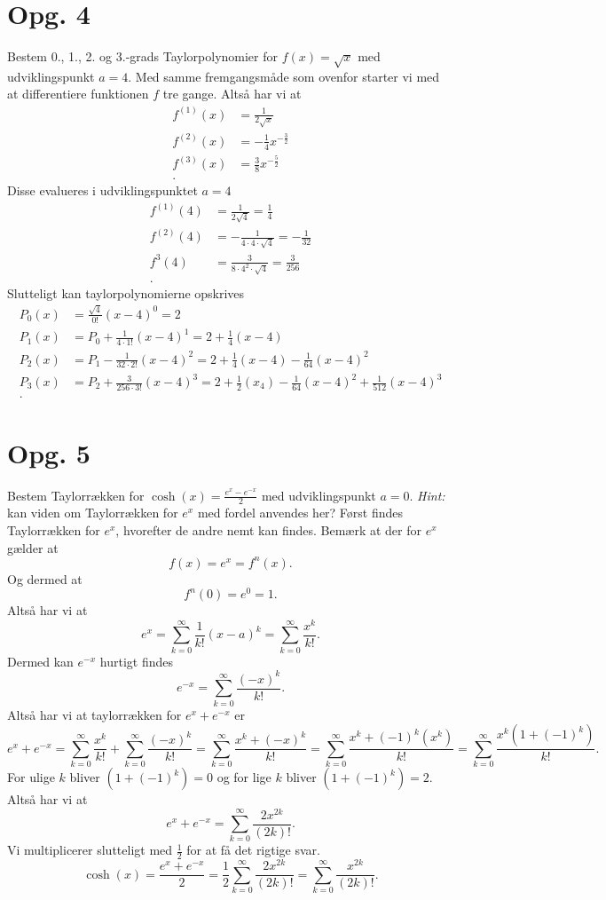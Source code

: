 \documentclass[12pt]{article}
\begin{document}
\section*{Opg. 4}
Bestem 0., 1., 2. og 3.-grads Taylorpolynomier for $f(x) = \sqrt{x}$ med udviklingspunkt $a=4$.
\bigbreak
Med samme fremgangsmåde som ovenfor starter vi med at differentiere funktionen $f$ tre gange. Altså har vi at
\begin{align*}
  f^{(1)}(x) &= \frac{1}{2\sqrt{x}} \\
  f^{(2)}(x) &= -\frac{1}{4}x^{-\frac{3}{2}} \\
  f^{(3)}(x) &= \frac{3}{8}x^{-\frac{5}{2}} \\
.\end{align*}
Disse evalueres i udviklingspunktet $a=4$
 \begin{align*}
  f^{(1)}(4) &= \frac{1}{2\sqrt{4}} = \frac{1}{4} \\
f^{(2)}(4) &= -\frac{1}{4\cdot 4\cdot  \sqrt{4}} = -\frac{1}{32} \\
f^{3}(4) &= \frac{3}{8\cdot 4^2\cdot \sqrt{4}} = \frac{3}{256} \\
.\end{align*}
Slutteligt kan taylorpolynomierne opskrives
\begin{align*}
  P_0(x) &= \frac{\sqrt{4}}{0!}(x-4)^0 = 2 \\
  P_1(x) &= P_0 + \frac{1}{4\cdot 1!} (x-4)^1 = 2 + \frac{1}{4}(x-4)\\
  P_2(x) &= P_1 - \frac{1}{32\cdot 2!}(x-4)^2 = 2 + \frac{1}{4}(x-4) - \frac{1}{64}(x-4)^2 \\
  P_3(x) &= P_2 + \frac{3}{256\cdot 3!}(x-4)^3 = 2+\frac{1}{2}(x_4) - \frac{1}{64}(x-4)^2 +\frac{1}{512}(x-4)^3 \\
.\end{align*}


\section*{Opg. 5}
Bestem Taylorrækken for $\cosh(x) = \frac{e^x-e^{-x}}{2}$ med udviklingspunkt $a=0$. \emph{Hint:} kan viden om Taylorrækken for $e^x$ med fordel anvendes her? 
\bigbreak
Først findes Taylorrækken for $e^x$, hvorefter de andre nemt kan findes. Bemærk at der for $e^x$ gælder at
 \[
f(x) = e^x = f^{n}(x)
.\]
Og dermed at
\[
f^{n}(0) = e^0 = 1
.\] 
Altså har vi at
\[
e^x = \sum_{k=0}^{\infty} \frac{1}{k!}(x-a)^k = \sum_{k=0}^{\infty} \frac{x^k}{k!}
.\] 
Dermed kan $e^{-x}$ hurtigt findes
\[
e^{-x} = \sum_{k=0}^{\infty} \frac{(-x)^k}{k!} 
.\]
Altså har vi at taylorrækken for $e^x+e^{-x}$ er
\[
e^x+e^{-x} = \sum_{k=0}^{\infty} \frac{x^k}{k!} + \sum_{k=0}^{\infty} \frac{(-x)^k}{k!} = \sum_{k=0}^{\infty} \frac{x^k+(-x)^k}{k!} = \sum_{k=0}^{\infty} \frac{x^k+(-1)^k(x^k)}{k!} = \sum_{k=0}^{\infty} \frac{x^k \left( 1 + (-1)^k \right) }{k!}
.\] 
For ulige $k$ bliver  $\left( 1+(-1)^k \right) = 0$ og for lige $k$ bliver  $\left( 1+(-1)^k \right) = 2$.
Altså har vi at
\[
  e^x + e^{-x} = \sum_{k=0}^{\infty} \frac{2x^{2k}}{(2k)!}
.\] 
Vi multiplicerer slutteligt med $\frac{1}{2}$ for at få det rigtige svar.
\[
\cosh(x) = \frac{e^x+e^{-x}}{2} = \frac{1}{2} \sum_{k=0}^{\infty} \frac{2x^{2k}}{(2k)!} =  \sum_{k=0}^{\infty} \frac{x^{2k}}{(2k)!}
.\] 
\end{document}

